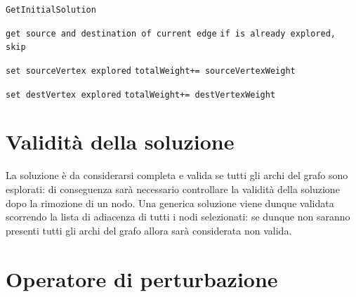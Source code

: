 \documentclass[11pt]{article}
\begin{document}
\begin{algorithm}
    \caption{\texttt{GetInitialSolution}}
    \begin{algorithmic}
        

        \State \texttt{get source and destination of current edge}
        \State \texttt{if is already explored, skip}

            \State\texttt {set sourceVertex explored}
            \State\texttt{totalWeight+= sourceVertexWeight}

        \Else{\texttt{}}

        \State\texttt {set destVertex explored}
        \State\texttt{totalWeight+= destVertexWeight}


        \EndIf{}
        \EndFor
        

    \end{algorithmic}
    \end{algorithm}


\pagebreak

\section{Validità della soluzione}

La soluzione è da considerarsi completa e valida se tutti gli archi del grafo sono esplorati: di conseguenza sarà necessario controllare la validità della soluzione dopo la rimozione di un nodo.
Una generica soluzione viene dunque validata scorrendo la lista di adiacenza di tutti i nodi selezionati: se dunque non saranno presenti tutti gli archi del grafo allora sarà considerata non valida.

\section{Operatore di perturbazione}
\end{document}
